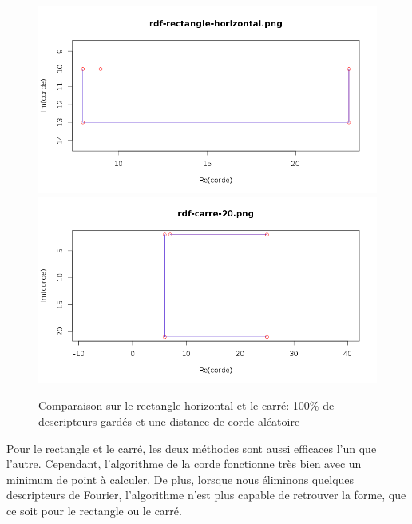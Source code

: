 \documentclass[11pt]{article}
\begin{document}
  
    \begin{figure}[!h]
      \begin{center}
	\includegraphics[width=13cm]{../resultat/comp_rect.png}\\
	\includegraphics[width=13cm]{../resultat/comp_carre.png}
      \end{center}
      \caption{Comparaison sur le rectangle horizontal et le carré: 100\% de descripteurs gardés et une distance de corde aléatoire}
    \end{figure}
  
  \newpage
  
  Pour le rectangle et le carré, les deux méthodes sont aussi efficaces l'un que l'autre. Cependant, l'algorithme de la corde
  fonctionne très bien avec un minimum de point à calculer.
  De plus, lorsque nous éliminons quelques descripteurs de Fourier, l'algorithme n'est plus capable de
  retrouver la forme, que ce soit pour le rectangle ou le carré.\\
  
\end{document}
